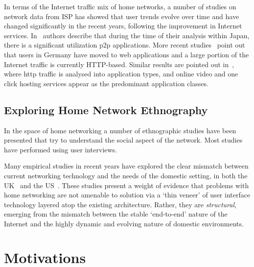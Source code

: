 In terms of the Internet traffic mix of home networks, a number of studies on
network data from ISP has showed that user trends evolve over time and have
changed significantly in the recent years, following the improvement in Internet
services. In~\cite{Cho2006} authors describe that during the time of their
analysis within Japan, there is a significant utilization p2p applications. More
recent studies~\cite{Maier2009} point out that users in Germany have moved to
web applications and a large portion of the Internet traffic is currently
HTTP-based. Similar results are pointed out in~\cite{Erman2011}, where http
traffic is analysed into application types, and online video and one click
hosting services appear as the predominant application classes. 

\subsection{Exploring Home Network Ethnography}

In the space of home networking a number of ethnographic studies have been
presented that try to understand the social aspect of the network. Most studies
have performed using user interviews. 



Many empirical studies in recent years have explored the clear mismatch between
current networking technology and the needs of the domestic setting,  in both
the
UK~\cite{tolmie07:_makin,rodden07:_disap_comput,rodden04:_domes,rodden04:_between,crabtree03:_findin_place_ubicom_home}
and the
US~\cite{shehan07:_home_networ_hci,grinter05:_work_make_home_networ_work,sung07:_my_roomb_rambo,chetty07:_how_smart_homes_learn,shehanpoole08:_desig_inter_home_networ_maint_tools}.
These studies present a weight of evidence that problems with home networking
are not amenable to solution via a `thin veneer' of user interface technology
layered atop the existing architecture.  Rather, they are \emph{structural},
emerging from the mismatch between the stable `end-to-end' nature of the
Internet and the highly dynamic and evolving nature of domestic environments.  


\section{Motivations}\label{s:evolution}


